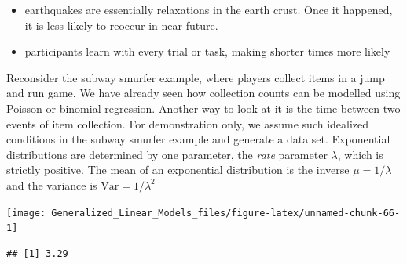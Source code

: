 \documentclass[]{svmono}
\newenvironment{Shaded}{\begin{snugshade}}{\end{snugshade}}
\newcommand{\KeywordTok}[1]{\textcolor[rgb]{0.13,0.29,0.53}{\textbf{#1}}}
\newcommand{\DataTypeTok}[1]{\textcolor[rgb]{0.13,0.29,0.53}{#1}}
\newcommand{\DecValTok}[1]{\textcolor[rgb]{0.00,0.00,0.81}{#1}}
\newcommand{\StringTok}[1]{\textcolor[rgb]{0.31,0.60,0.02}{#1}}
\newcommand{\OperatorTok}[1]{\textcolor[rgb]{0.81,0.36,0.00}{\textbf{#1}}}
\newcommand{\NormalTok}[1]{#1}
\providecommand{\tightlist}{%
  \setlength{\itemsep}{0pt}\setlength{\parskip}{0pt}}
\begin{document}
\begin{itemize}
\tightlist
\item
  earthquakes are essentially relaxations in the earth crust. Once it
  happened, it is less likely to reoccur in near future.
\item
  participants learn with every trial or task, making shorter times more
  likely
\end{itemize}

Reconsider the subway smurfer example, where players collect items in a
jump and run game. We have already seen how collection counts can be
modelled using Poisson or binomial regression. Another way to look at it
is the time between two events of item collection. For demonstration
only, we assume such idealized conditions in the subway smurfer example
and generate a data set. Exponential distributions are determined by one
parameter, the \emph{rate} parameter \(\lambda\), which is strictly
positive. The mean of an exponential distribution is the inverse
\(\mu = 1/\lambda\) and the variance is \(\textrm{Var} = 1/\lambda^2\)

\begin{Shaded}
\end{Shaded}

\texttt{[image: Generalized\_Linear\_Models\_files/figure-latex/unnamed-chunk-66-1]}

\begin{Shaded}
\end{Shaded}

\begin{verbatim}
## [1] 3.29
\end{verbatim}
\end{document}
